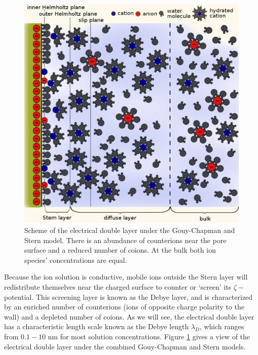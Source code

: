 			\begin{figure}
				\includegraphics[width=\textwidth]{edl.png}
				\caption{Scheme of the electrical double layer under the Gouy-Chapman and Stern model. There is an abundance of counterions near the pore surface and a reduced number of coions. At the bulk both ion species' concentrations are equal.}
				
				 \label{fig:edl}
			\end{figure}
			
			Because the ion solution is conductive, mobile ions outside the Stern layer will redistribute themselves near the charged surface to counter or `screen' its $\zeta-$potential. This screening layer is known as the Debye layer, and is characterized by an enriched number of counterions (ions of opposite charge polarity to the wall) and a depleted number of coions. As we will see, the electrical double layer has a characteristic length scale known as the Debye length $\lambda_{D}$, which ranges from $0.1-10$ nm for most solution concentrations. Figure \ref{fig:edl} gives a view of the electrical double layer under the combined Gouy-Chapman and Stern models. 

